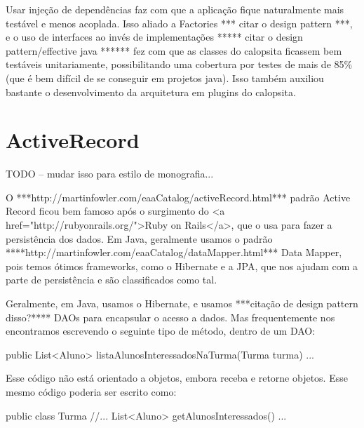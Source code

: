 Usar injeção de dependências faz com que a aplicação fique naturalmente mais testável e menos acoplada. Isso aliado a
Factories *** citar o design pattern ***, e o uso de interfaces ao invés de implementações ***** citar o design 
pattern/effective java ****** fez com que as classes do calopsita ficassem bem testáveis unitariamente, possibilitando 
uma cobertura por testes de mais de 85\% (que é bem difícil de se conseguir em projetos java). Isso também auxiliou bastante
o desenvolvimento da arquitetura em plugins do calopsita.

\section{ActiveRecord}

TODO -- mudar isso para estilo de monografia...

O ***http://martinfowler.com/eaaCatalog/activeRecord.html*** padrão Active Record ficou bem famoso após o 
surgimento do <a href="http://rubyonrails.org/">Ruby on Rails</a>, que o usa para fazer a persistência dos 
dados. Em Java, geralmente usamos o padrão ****http://martinfowler.com/eaaCatalog/dataMapper.html*** Data 
Mapper, pois temos ótimos frameworks, como o Hibernate e a JPA, que nos ajudam com a parte de persistência 
e são classificados como tal.

Geralmente, em Java, usamos o Hibernate, e usamos ***citação de design pattern disso?**** DAOs para encapsular 
o acesso a dados. Mas frequentemente nos encontramos escrevendo o seguinte tipo de método, dentro de um DAO:

public List<Aluno> listaAlunosInteressadosNaTurma(Turma turma) {...}

Esse código não está orientado a objetos, embora receba e retorne objetos. Esse mesmo código poderia ser escrito como:

public class Turma {
   //...
   List<Aluno> getAlunosInteressados() {...}
}

